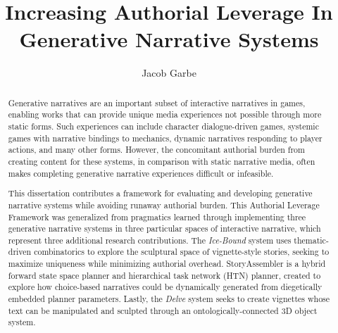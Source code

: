 \documentclass[11pt]{ucthesis}
\begin{document}

\title{Increasing Authorial Leverage In Generative Narrative Systems}
\author{Jacob Garbe}
\deanlinethree{}


\begin{frontmatter}

\maketitle
\copyrightpage

\tableofcontents
\listoffigures

\begin{abstract}
Generative narratives are an important subset of interactive narratives in games, enabling works that can provide unique media experiences not possible through more static forms. Such experiences can include character dialogue-driven games, systemic games with narrative bindings to mechanics, dynamic narratives responding to player actions, and many other forms. However, the concomitant authorial burden from creating content for these systems, in comparison with static narrative media, often makes completing generative narrative experiences difficult or infeasible.

This dissertation contributes a framework for evaluating and developing generative narrative systems while avoiding runaway authorial burden. This Authorial Leverage Framework was generalized from pragmatics learned through implementing three generative narrative systems in three particular spaces of interactive narrative, which represent three additional research contributions. The \textit{Ice-Bound} system uses thematic-driven combinatorics to explore the sculptural space of vignette-style stories, seeking to maximize uniqueness while minimizing authorial overhead. StoryAssembler is a hybrid forward state space planner and hierarchical task network (HTN) planner, created to explore how choice-based narratives could be dynamically generated from diegetically embedded planner parameters. Lastly, the \textit{Delve} system seeks to create vignettes whose text can be manipulated and sculpted through an ontologically-connected 3D object system. 


\end{abstract}
\end{frontmatter}
\end{document}
